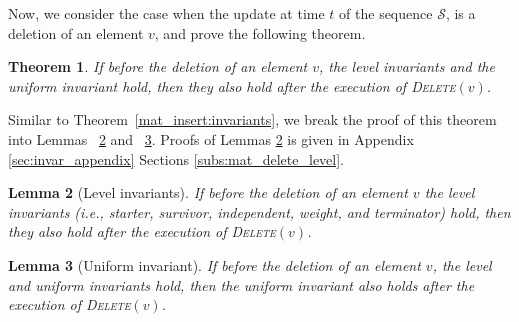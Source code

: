\documentclass[11pt]{article}
\newtheorem{theorem}{Theorem}
\newtheorem{lemma}[theorem]{Lemma}
\newcommand{\deletev}{{\textsc{Delete}}}
\begin{document}
Now, we consider the case when the update at time $t$ of the sequence $\mathcal{S}$, is a deletion of an element $v$, and prove the following theorem. 

\begin{theorem}
\label{mat_delete:invariants}
If before the deletion of an element $v$, the level invariants and the uniform invariant hold, then they also hold after the execution of \deletev$(v)$. 
\end{theorem}

Similar to Theorem~\ref{mat_insert:invariants}, we break the proof of this theorem into 
Lemmas ~\ref{mat_delete_level} and ~\ref{mat_delete_uni}. Proofs of Lemmas \ref{mat_delete_level} is given in Appendix \ref{sec:invar_appendix} Sections \ref{subs:mat_delete_level}.


\begin{lemma}[Level invariants]
\label{mat_delete_level}
If before the deletion of an element $v$ the level invariants (i.e., starter, survivor, independent, weight, and terminator) hold, 
then they also hold after the execution of \deletev$(v)$. 
\end{lemma}

\begin{lemma} [Uniform invariant]
\label{mat_delete_uni}
If before the deletion of an element $v$, the level and uniform invariants hold, then the uniform invariant also holds after the execution of \deletev$(v)$. 
\end{lemma}
\end{document}
